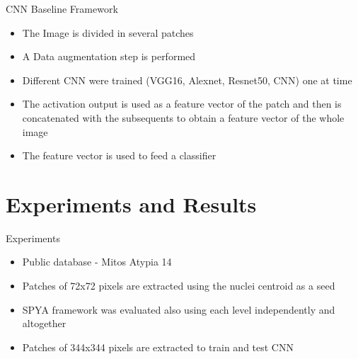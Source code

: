 \documentclass[usenames,dvipsnames]{beamer}
\begin{document}
\begin{frame}{CNN Baseline Framework}
\begin{itemize}
 \item The Image is divided in several patches
 \pause
 \item A Data augmentation step is performed

 \pause \item Different CNN were trained (VGG16, Alexnet, Resnet50, CNN) one at time
  \pause\item The activation output is used as a feature vector of the patch and then is concatenated with the subsequents to obtain a feature vector of the whole image
  \pause \item The feature vector is used to feed a classifier
\end{itemize}
\end{frame}

\section{Experiments and Results}

\begin{frame}{Experiments }
\begin{itemize}
\item Public database - Mitos Atypia 14
\item  Patches of 72x72 pixels are extracted using the nuclei centroid as a seed
\item SPYA framework was evaluated also using each level independently and altogether
\item Patches of 344x344 pixels are extracted to train and test CNN

 
\end{itemize}

\end{frame}
\end{document}
